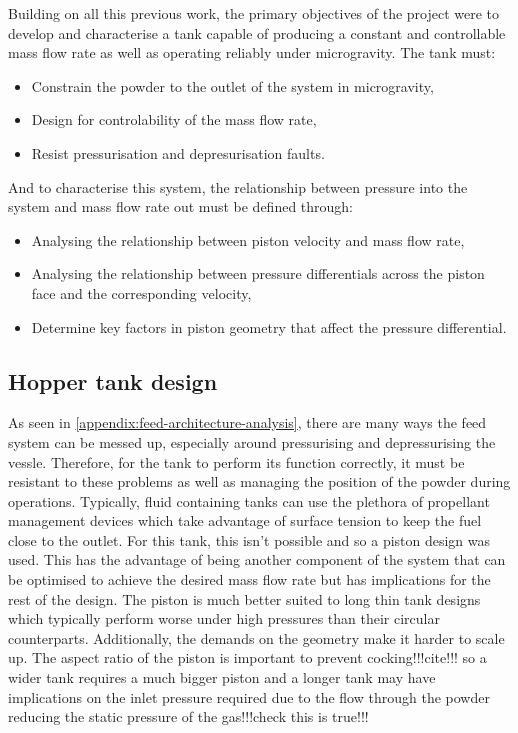 Building on all this previous work, the primary objectives of the project were to develop and characterise a tank capable of producing a constant and controllable mass flow rate as well as operating reliably under microgravity. The tank must:
\begin{itemize}
    \item Constrain the powder to the outlet of the system in microgravity,
    \item Design for controlability of the mass flow rate,
    \item Resist pressurisation and depresurisation faults.
\end{itemize}
And to characterise this system, the relationship between pressure into the system and mass flow rate out must be defined through:
\begin{itemize}
    \item Analysing the relationship between piston velocity and mass flow rate,
    \item Analysing the relationship between pressure differentials across the piston face and the corresponding velocity,
    \item Determine key factors in piston geometry that affect the pressure differential.
\end{itemize}


\subsection{Hopper tank design}
As seen in \autoref{appendix:feed-architecture-analysis}, there are many ways the feed system can be messed up, especially around pressurising and depressurising the vessle. Therefore, for the tank to perform its function correctly, it must be resistant to these problems as well as managing the position of the powder during operations. Typically, fluid containing tanks can use the plethora of propellant management devices which take advantage of surface tension to keep the fuel close to the outlet. For this tank, this isn't possible and so a piston design was used. This has the advantage of being another component of the system that can be optimised to achieve the desired mass flow rate but has implications for the rest of the design. The piston is much better suited to long thin tank designs which typically perform worse under high pressures than their circular counterparts. Additionally, the demands on the geometry make it harder to scale up. The aspect ratio of the piston is important to prevent cocking!!!cite!!! so a wider tank requires a much bigger piston and a longer tank may have implications on the inlet pressure required due to the flow through the powder reducing the static pressure of the gas!!!check this is true!!!



